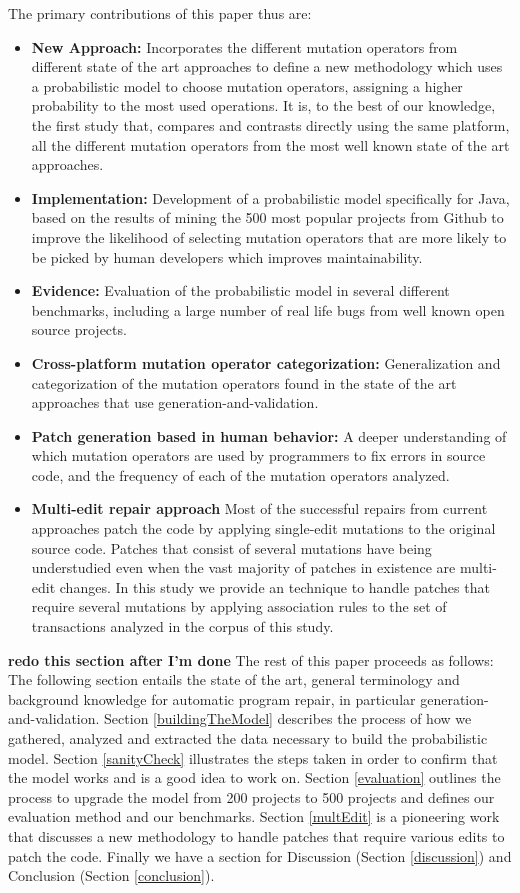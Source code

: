 \documentclass[conference]{IEEEtran}
\newcommand{\todo}[1]
  {{\scriptsize \textbf{\color{red} {#1}}}}
\begin{document}
The primary contributions of this paper thus are:
\begin{itemize}
  \item \textbf{New Approach:} Incorporates the different mutation operators from different state of the art approaches to define a new methodology which uses a probabilistic model to choose mutation operators, assigning a higher probability to the most used operations. It is, to the best of our knowledge, the first study that, compares and contrasts directly using the same platform, all the different mutation operators from the most well known state of the art approaches. 
  \item \textbf{Implementation:} Development of a probabilistic model specifically for Java, based on the results of mining the 500 most popular projects from Github to improve the likelihood of selecting mutation operators that are more likely to be picked by human developers which improves maintainability.
  \item \textbf{Evidence:} Evaluation of the probabilistic model in several different benchmarks, including a large number of real life bugs from well known open source projects.
  \item \textbf{Cross-platform mutation operator categorization:} Generalization and categorization of the mutation operators found in the state of the art approaches that use generation-and-validation.
  \item \textbf{Patch generation based in human behavior:} A deeper understanding of which mutation operators are used by programmers to fix errors in source code, and the frequency of each of the mutation operators analyzed.
  \item \textbf{Multi-edit repair approach} Most of the successful repairs from current approaches patch the code by applying single-edit mutations to the original source code. Patches that consist of several mutations have being understudied even when the vast majority of patches in existence are multi-edit changes. In this study we provide an technique to handle patches that require several mutations by applying association rules to the set of transactions analyzed in the corpus of this study.  
\end{itemize}

\todo{redo this section after I'm done}
The rest of this paper proceeds as follows:
The following section entails the state of the art, general terminology and background knowledge for automatic program repair, in particular generation-and-validation. Section \ref{buildingTheModel} describes the process of how we gathered, analyzed and extracted the data necessary to build the probabilistic model. Section \ref{sanityCheck} illustrates the steps taken in order to confirm that the model works and is a good idea to work on. Section \ref{evaluation} outlines the process to upgrade the model from 200 projects to 500 projects and defines our evaluation method and our benchmarks. Section \ref{multEdit} is a pioneering work that discusses a new methodology to handle patches that require various edits to patch the code. Finally we have a section for Discussion (Section \ref{discussion}) and Conclusion (Section \ref{conclusion}).
\end{document}
